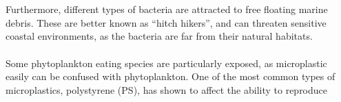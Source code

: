 \\\\
Furthermore, different types of bacteria are attracted to free floating marine debris. These are better known as “hitch hikers”, and can threaten sensitive coastal environments, as the bacteria are far from their natural habitats. 
\\\\
Some phytoplankton eating species are particularly exposed, as microplastic easily can be confused with phytoplankton. One of the most common types of microplastics, polystyrene (PS), has shown to affect the ability to reproduce %



